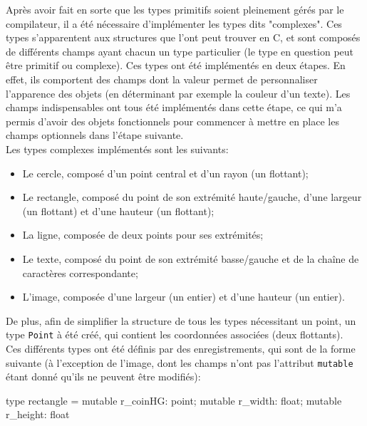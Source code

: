 \documentclass[a4paper, 12pt]{report}
\begin{document}
	Après avoir fait en sorte que les types primitifs soient pleinement gérés par le compilateur, il a été nécessaire d'implémenter les types dits "complexes". Ces types s'apparentent aux structures que l'ont peut trouver en C, et sont composés de différents champs ayant chacun un type particulier (le type en question peut être primitif ou complexe). Ces types ont été implémentés en deux étapes. En effet, ils comportent des champs dont la valeur permet de personnaliser l'apparence des objets (en déterminant par exemple la couleur d'un texte). Les champs indispensables ont tous été implémentés dans cette étape, ce qui m'a permis d'avoir des objets fonctionnels pour commencer à mettre en place les champs optionnels dans l'étape suivante.\\
	
	Les types complexes implémentés sont les suivants:\\
	
	\begin{itemize}
		\item Le cercle, composé d'un point central et d'un rayon (un flottant);
		\item Le rectangle, composé du point de son extrémité haute/gauche, d'une largeur (un flottant) et d'une hauteur (un flottant);
		\item La ligne, composée de deux points pour ses extrémités;
		\item Le texte, composé du point de son extrémité basse/gauche et de la cha\^ine de caractères correspondante;
		\item L'image, composée d'une largeur (un entier) et d'une hauteur (un entier).\\
	\end{itemize}
	
	De plus, afin de simplifier la structure de tous les types nécessitant un point, un type \texttt{Point} à été créé, qui contient les coordonnées associées (deux flottants).\\
	
	Ces différents types ont été définis par des enregistrements, qui sont de la forme suivante (à l'exception de l'image, dont les champs n'ont pas l'attribut \texttt{mutable} étant donné qu'ils ne peuvent être modifiés):\\
	
	\begin{verbatimtab}[4]
	type rectangle = {
		mutable r_coinHG: point;
		mutable r_width: float;
		mutable r_height: float
	}
	\end{verbatimtab}
	
\end{document}

